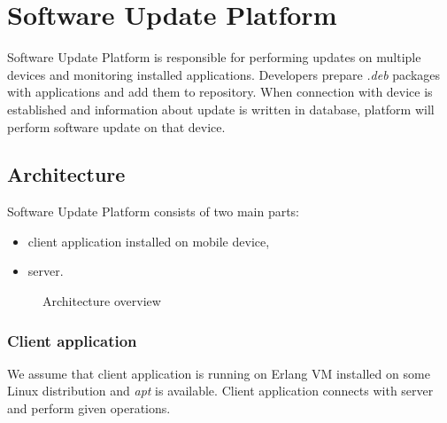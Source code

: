 \section{Software Update Platform}

Software Update Platform is responsible for performing updates on multiple devices and monitoring
installed applications. Developers prepare \emph{.deb} packages with applications and add them to
repository. When connection with device is established and information about update is written in
database, platform will perform software update on that device.


\subsection{Architecture}

Software Update Platform consists of two main parts:
\begin{itemize}
  \item client application installed on mobile device,
  \item server.
\end{itemize}

\begin{figure}[htbp]
  \centering
    \caption{Architecture overview}
\end{figure}

\subsubsection*{Client application}

We assume that client application is running on Erlang VM installed on some Linux distribution and
\emph{apt} is available. Client application connects with server and perform given operations.


